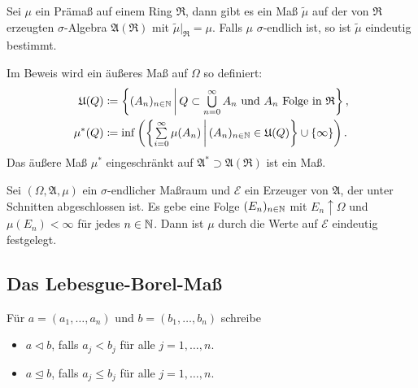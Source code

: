 \documentclass{cheat-sheet}
\newcommand{\Alg}{\mathfrak{A}} %
\newcommand{\Ring}{\mathfrak{R}} %
\theoremstyle{definition}
\begin{document}
\begin{satz}
  Sei $\mu$ ein Prämaß auf einem Ring $\Ring$, dann gibt es ein Maß $\tilde{\mu}$ auf der von $\Ring$ erzeugten $\sigma$-Algebra $\Alg(\Ring)$ mit $\tilde{\mu}|_\Ring = \mu$. Falls $\mu$ $\sigma$-endlich ist, so ist $\tilde{\mu}$ eindeutig bestimmt.
\end{satz}

\begin{bem}
  Im Beweis wird ein äußeres Maß auf $\Omega$ so definiert:
  \begin{align*}
    \mathfrak{U}(Q) &\coloneqq \left\{ (A_n)_{n \in \N} \,\middle|\, Q \subset \bigcup_{n = 0}^\infty A_n \text{ und } A_n \text{ Folge in } \Ring \right\}, \\
    \mu^*(Q) &\coloneqq \inf \left( \left\{ \sum_{i = 0}^\infty \mu(A_n) \,\middle|\, (A_n)_{n \in \N} \in \mathfrak{U}(Q) \right\} \cup \{ \infty \} \right).
  \end{align*}
  Das äußere Maß $\mu^*$ eingeschränkt auf $\Alg^* \supset \Alg(\Ring)$ ist ein Maß.
\end{bem}

\begin{satz}
  Sei $(\Omega, \Alg, \mu)$ ein $\sigma$-endlicher Maßraum und $\mathcal{E}$ ein Erzeuger von $\Alg$, der unter Schnitten abgeschlossen ist. Es gebe eine Folge $(E_n)_{n \in \mathbb{N}}$ mit $E_n \uparrow \Omega$ und $\mu(E_n) < \infty$ für jedes $n \in \mathbb{N}$. Dann ist $\mu$ durch die Werte auf $\mathcal{E}$ eindeutig festgelegt.
\end{satz}

\begin{samepage}


\subsection{Das Lebesgue-Borel-Maß}

\begin{nota}
  Für $a = (a_1, \ldots, a_n)$ und $b = (b_1, \ldots, b_n)$ schreibe
  \begin{itemize}
    \item $a \lhd b$, falls $a_j < b_j$ für alle $j = 1, \ldots, n$.
    \item $a \unlhd b$, falls $a_j \leq b_j$ für alle $j = 1, \ldots, n$.
  \end{itemize}
\end{nota}

\end{samepage}
\end{document}
